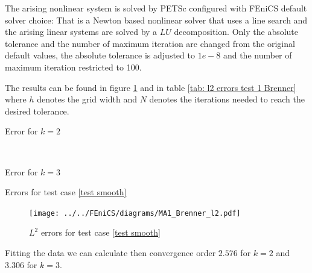 The arising nonlinear system is solved by PETSc configured with FEniCS default solver choice: That is a Newton based nonlinear solver that uses a line search and the arising linear systems are solved by a $LU$ decomposition.
Only the absolute tolerance and the number of maximum iteration are changed from the original default values, the absolute tolerance is adjusted to $1e-8$ and the number of maximum iteration restricted to 100. 

The results can be found in figure \ref{fig: Brenner test1} and in table \ref{tab: l2 errors test 1 Brenner} where $h$ denotes the grid width and $N$ denotes the iterations needed to reach the desired tolerance. 

\begin{table}[h]
	\begin{subtable}[b]{0.45\textwidth}
		\centering
		\pgfplotstabletypeset[columns={iterations, l2error, h1error,N},
				    every row 0 column 0/.style={set content=init},
		]\MAOneBrennerTwo
    	\caption{Error for $k=2$}
   \end{subtable}
   ~
	\begin{subtable}[b]{0.45\textwidth}
		\centering
		\pgfplotstabletypeset[columns={iterations, l2error, h1error,N},
				    every row 0 column 0/.style={set content=init},
		]\MAOneBrennerThree
 	\caption{Error for $k=3$}
	\end{subtable}
	\caption{Errors for test case \ref{test smooth}}
	\label{tab: l2 errors test 1 Brenner}
\end{table}
\begin{figure}[H]
\centering
	\texttt{[image: ../../FEniCS/diagrams/MA1\_Brenner\_l2.pdf]}
	\caption{$L^2$ errors for test case \ref{test smooth}}
	\label{fig: Brenner test1}
\end{figure}
Fitting the data we can calculate then convergence order  $2.576$ for $k=2$ and $3.306$ for $k=3$.

